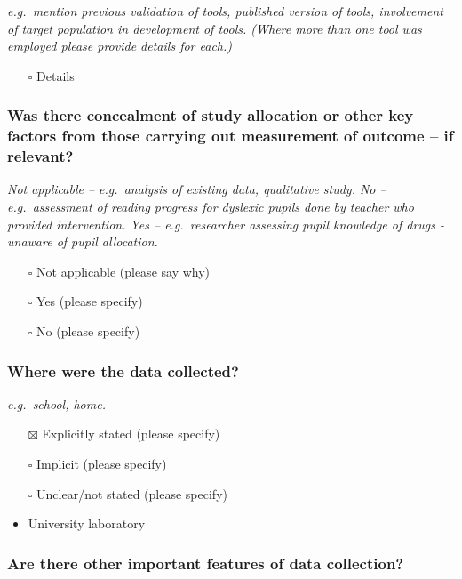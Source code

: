 \documentclass[
  doc, a4paper]{apa7}
\providecommand{\tightlist}{%
  \setlength{\itemsep}{0pt}\setlength{\parskip}{0pt}}
\begin{document}
\emph{e.g.~mention previous validation of tools, published version of tools, involvement of target population in development of tools. (Where more than one tool was employed please provide details for each.)}

\begin{itemize}
\tightlist
\item[$\square$]
  Details
\end{itemize}

\subsubsection{Was there concealment of study allocation or other key factors from those carrying out measurement of outcome -- if relevant?}\label{was-there-concealment-of-study-allocation-or-other-key-factors-from-those-carrying-out-measurement-of-outcome-if-relevant}

\emph{Not applicable -- e.g.~analysis of existing data, qualitative study. No -- e.g.~assessment of reading progress for dyslexic pupils done by teacher who provided intervention. Yes -- e.g.~researcher assessing pupil knowledge of drugs - unaware of pupil allocation.}

\begin{itemize}
\tightlist
\item[$\square$]
  Not applicable (please say why)
\item[$\square$]
  Yes (please specify)
\item[$\square$]
  No (please specify)
\end{itemize}

\subsubsection{Where were the data collected?}\label{where-were-the-data-collected}

\emph{e.g.~school, home.}

\begin{itemize}
\item[$\boxtimes$]
  Explicitly stated (please specify)
\item[$\square$]
  Implicit (please specify)
\item[$\square$]
  Unclear/not stated (please specify)
\item
  University laboratory
\end{itemize}

\subsubsection{Are there other important features of data collection?}\label{are-there-other-important-features-of-data-collection}
\end{document}
